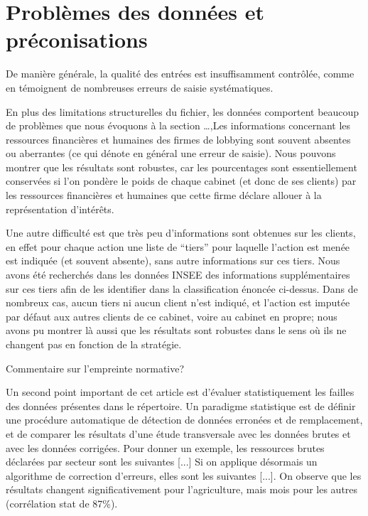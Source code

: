 \documentclass[a4paper,12pt]{article}
\begin{document}
  

\section{Problèmes des données et préconisations}


De manière générale, la qualité des entrées est insuffisamment contrôlée, comme en témoignent de nombreuses erreurs de saisie systématiques. 


En plus des limitations structurelles du fichier, les données comportent beaucoup de problèmes que nous évoquons à la section …,Les informations concernant les ressources financières et humaines des firmes de lobbying sont souvent absentes ou aberrantes (ce qui dénote en général une erreur de saisie). Nous pouvons montrer que les résultats sont robustes, car les pourcentages sont essentiellement conservées si l’on pondère le poids de chaque cabinet (et donc de ses clients) par les ressources financières et humaines que cette firme déclare allouer à la représentation d’intérêts. 

Une autre difficulté est que très peu d’informations sont obtenues sur les clients, en effet pour chaque action une liste de “tiers” pour laquelle l’action est menée est indiquée (et souvent absente), sans autre informations sur ces tiers. Nous avons été recherchés dans les données INSEE des informations supplémentaires sur ces tiers afin de les identifier dans la classification énoncée ci-dessus. Dans de nombreux cas, aucun tiers ni aucun client n’est indiqué, et l’action est imputée par défaut aux autres clients de ce cabinet, voire au cabinet en propre; nous avons pu montrer là aussi que les résultats sont robustes dans le sens où ils ne changent pas en fonction de la stratégie.


Commentaire sur l’empreinte normative?


Un second point important de cet article est d’évaluer statistiquement les failles des données présentes dans le répertoire. Un paradigme statistique est de définir une procédure automatique de détection de données erronées et de remplacement, et de comparer les résultats d’une étude transversale avec les données brutes et avec les données corrigées. Pour donner un exemple, les ressources brutes déclarées par secteur sont les suivantes [...] Si on applique désormais un algorithme de correction d’erreurs, elles sont les suivantes [...]. On observe que les résultats changent significativement pour l’agriculture, mais mois pour les autres (corrélation stat de 87\%). 
\end{document}
